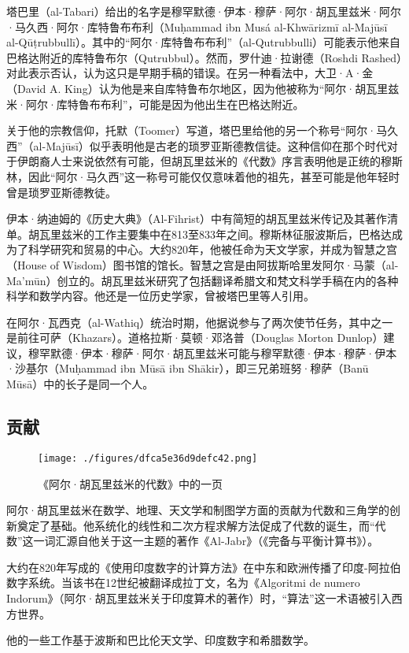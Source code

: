 塔巴里（al-Tabari）给出的名字是穆罕默德·伊本·穆萨·阿尔·胡瓦里兹米·阿尔·马久西·阿尔·库特鲁布布利（Muḥammad ibn Musá al-Khwārizmī al-Majūsī al-Qūṭrubbullī）。其中的“阿尔·库特鲁布布利”（al-Qutrubbulli）可能表示他来自巴格达附近的库特鲁布尔（Qutrubbul）。然而，罗什迪·拉谢德（Roshdi Rashed）对此表示否认，认为这只是早期手稿的错误。在另一种看法中，大卫·A·金（David A. King）认为他是来自库特鲁布尔地区，因为他被称为“阿尔·胡瓦里兹米·阿尔·库特鲁布布利”，可能是因为他出生在巴格达附近。

关于他的宗教信仰，托默（Toomer）写道，塔巴里给他的另一个称号“阿尔·马久西”（al-Majūsī）似乎表明他是古老的琐罗亚斯德教信徒。这种信仰在那个时代对于伊朗裔人士来说依然有可能，但胡瓦里兹米的《代数》序言表明他是正统的穆斯林，因此“阿尔·马久西”这一称号可能仅仅意味着他的祖先，甚至可能是他年轻时曾是琐罗亚斯德教徒。

伊本·纳迪姆的《历史大典》（Al-Fihrist）中有简短的胡瓦里兹米传记及其著作清单。胡瓦里兹米的工作主要集中在813至833年之间。穆斯林征服波斯后，巴格达成为了科学研究和贸易的中心。大约820年，他被任命为天文学家，并成为智慧之宫（House of Wisdom）图书馆的馆长。智慧之宫是由阿拔斯哈里发阿尔·马蒙（al-Ma'mūn）创立的。胡瓦里兹米研究了包括翻译希腊文和梵文科学手稿在内的各种科学和数学内容。他还是一位历史学家，曾被塔巴里等人引用。

在阿尔·瓦西克（al-Wathiq）统治时期，他据说参与了两次使节任务，其中之一是前往可萨（Khazars）。道格拉斯·莫顿·邓洛普（Douglas Morton Dunlop）建议，穆罕默德·伊本·穆萨·阿尔·胡瓦里兹米可能与穆罕默德·伊本·穆萨·伊本·沙基尔（Muḥammad ibn Mūsā ibn Shākir），即三兄弟班努·穆萨（Banū Mūsā）中的长子是同一个人。
\subsection{贡献}
\begin{figure}[ht]
\centering
\texttt{[image: ./figures/dfca5e36d9defc42.png]}
\caption{《阿尔·胡瓦里兹米的代数》中的一页} \label{fig_HLZM_3}
\end{figure}
阿尔·胡瓦里兹米在数学、地理、天文学和制图学方面的贡献为代数和三角学的创新奠定了基础。他系统化的线性和二次方程求解方法促成了代数的诞生，而“代数”这一词汇源自他关于这一主题的著作《Al-Jabr》（《完备与平衡计算书》）。

大约在820年写成的《使用印度数字的计算方法》在中东和欧洲传播了印度-阿拉伯数字系统。当该书在12世纪被翻译成拉丁文，名为《Algoritmi de numero Indorum》（阿尔·胡瓦里兹米关于印度算术的著作）时，“算法”这一术语被引入西方世界。

他的一些工作基于波斯和巴比伦天文学、印度数字和希腊数学。

